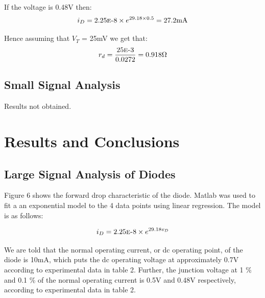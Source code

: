\documentclass{article}
\begin{document}
If the voltage is 0.48V then:
\begin{align*}
i_D = 2.25\mbox{\sc{e}-}8 \times e^{29.18 \times 0.5} = 27.2\si{\milli\ampere}
\end{align*}

Hence assuming that $V_T$ = 25\si{\milli \volt} we get that:
\begin{align*}
r_d = \frac{25\mbox{\sc{e}-}3}{0.0272} = 0.918\si{\ohm}
\end{align*}

\subsection{Small Signal Analysis}
Results not obtained.


\section{Results and Conclusions}

\subsection{Large Signal Analysis of Diodes}

Figure 6 shows the forward drop characteristic of the diode. Matlab was used to fit a an exponential model to the 4 data points using linear regression. The model is as follows:

\begin{align}
i_D = 2.25\mbox{\sc{e}-}8 \times e^{29.18v_D}
\end{align}
 
We are told that the normal operating current, or dc operating point, of the diode is 10mA, which puts the dc operating voltage at approximately 0.7V according to experimental data in table 2. Further, the junction voltage at 1 \% and 0.1 \% of the normal operating current is 0.5V and 0.48V respectively, according to experimental data in table 2.
\end{document}
